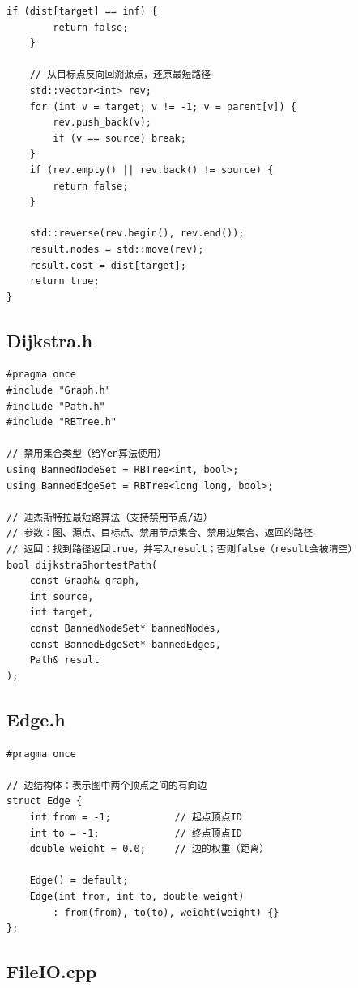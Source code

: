 \documentclass[UTF8,12pt,a4paper]{ctexart}
\begin{document}
\begin{lstlisting}[caption={Dijkstra.cpp源码}]
    if (dist[target] == inf) {
        return false;
    }

    // 从目标点反向回溯源点，还原最短路径
    std::vector<int> rev;
    for (int v = target; v != -1; v = parent[v]) {
        rev.push_back(v);
        if (v == source) break;
    }
    if (rev.empty() || rev.back() != source) {
        return false;
    }

    std::reverse(rev.begin(), rev.end());
    result.nodes = std::move(rev);
    result.cost = dist[target];
    return true;
}
\end{lstlisting}

\subsection{Dijkstra.h}

\begin{lstlisting}[caption={Dijkstra.h 源码}]
#pragma once
#include "Graph.h"
#include "Path.h"
#include "RBTree.h"

// 禁用集合类型（给Yen算法使用）
using BannedNodeSet = RBTree<int, bool>;
using BannedEdgeSet = RBTree<long long, bool>;

// 迪杰斯特拉最短路算法（支持禁用节点/边）
// 参数：图、源点、目标点、禁用节点集合、禁用边集合、返回的路径
// 返回：找到路径返回true，并写入result；否则false（result会被清空）
bool dijkstraShortestPath(
    const Graph& graph,
    int source,
    int target,
    const BannedNodeSet* bannedNodes,
    const BannedEdgeSet* bannedEdges,
    Path& result
);
\end{lstlisting}

\subsection{Edge.h}

\begin{lstlisting}[caption={Edge.h 源码}]
#pragma once

// 边结构体：表示图中两个顶点之间的有向边
struct Edge {
    int from = -1;           // 起点顶点ID
    int to = -1;             // 终点顶点ID
    double weight = 0.0;     // 边的权重（距离）

    Edge() = default;
    Edge(int from, int to, double weight)
        : from(from), to(to), weight(weight) {}
};
\end{lstlisting}

\subsection{FileIO.cpp}
\end{document}
